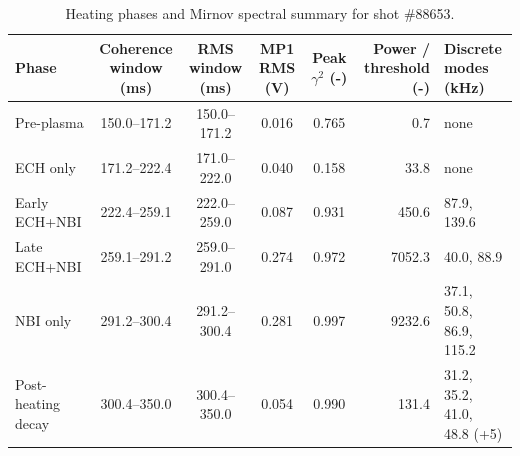 \begin{table}[H]
\centering
\small
\setlength{\tabcolsep}{4.5pt}
\renewcommand{\arraystretch}{1.15}
\caption[Heating phases and Mirnov spectral summary for shot \#88653]{Heating phases and Mirnov spectral summary for shot \#88653.}
\label{tab:discharge_phases}
\begin{tabular}{lccccrl}
\toprule
Phase & \shortstack{Coherence\\window (ms)} & \shortstack{RMS\\window (ms)} & \shortstack{MP1\\RMS (V)} & \shortstack{Peak\\$\gamma^2$ (-)} & \shortstack{Power /\\threshold (-)} & \shortstack{Discrete\\modes (kHz)} \\
\midrule
Pre-plasma & 150.0--171.2 & 150.0--171.2 & 0.016 & 0.765 & 0.7 & none \\
ECH only & 171.2--222.4 & 171.0--222.0 & 0.040 & 0.158 & 33.8 & none \\
Early ECH+NBI & 222.4--259.1 & 222.0--259.0 & 0.087 & 0.931 & 450.6 & 87.9, 139.6 \\
Late ECH+NBI & 259.1--291.2 & 259.0--291.0 & 0.274 & 0.972 & 7052.3 & 40.0, 88.9 \\
NBI only & 291.2--300.4 & 291.2--300.4 & 0.281 & 0.997 & 9232.6 & \shortstack[l]{37.1, 50.8,\\86.9, 115.2} \\
\shortstack[l]{Post-heating\\decay} & 300.4--350.0 & 300.4--350.0 & 0.054 & 0.990 & 131.4 & \shortstack[l]{31.2, 35.2, 41.0,\\48.8 (+5)} \\
\bottomrule
\end{tabular}
\par{}
\end{table}
